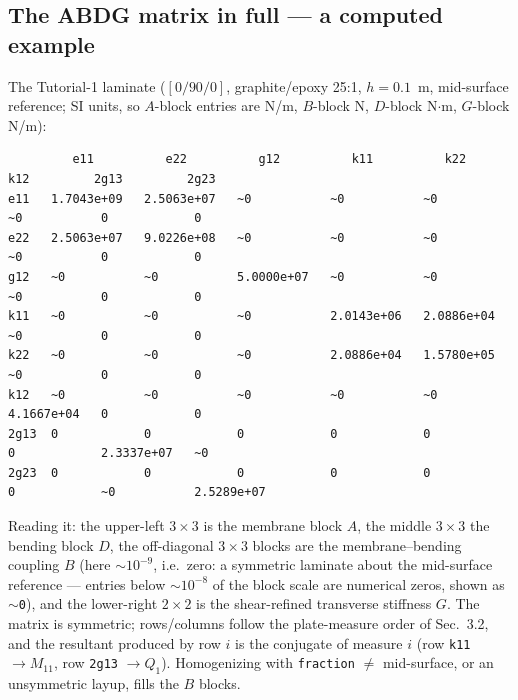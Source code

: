 \documentclass[11pt]{article}
\newcommand{\code}[1]{\texttt{#1}}
\begin{document}
\subsection{The ABDG matrix in full --- a computed example}
The Tutorial-1 laminate ($[0/90/0]$, graphite/epoxy 25:1, $h=0.1$~m,
mid-surface reference; SI units, so $A$-block entries are N/m,
$B$-block N, $D$-block N$\cdot$m, $G$-block N/m):
{\scriptsize
\begin{verbatim}
         e11          e22          g12          k11          k22          k12         2g13         2g23
e11   1.7043e+09   2.5063e+07   ~0           ~0           ~0           ~0           0            0
e22   2.5063e+07   9.0226e+08   ~0           ~0           ~0           ~0           0            0
g12   ~0           ~0           5.0000e+07   ~0           ~0           ~0           0            0
k11   ~0           ~0           ~0           2.0143e+06   2.0886e+04   ~0           0            0
k22   ~0           ~0           ~0           2.0886e+04   1.5780e+05   ~0           0            0
k12   ~0           ~0           ~0           ~0           ~0           4.1667e+04   0            0
2g13  0            0            0            0            0            0            2.3337e+07   ~0
2g23  0            0            0            0            0            0            ~0           2.5289e+07
\end{verbatim}}
Reading it: the upper-left $3\times3$ is the membrane block $A$, the
middle $3\times3$ the bending block $D$, the off-diagonal $3\times3$
blocks are the membrane--bending coupling $B$ (here $\sim10^{-9}$,
i.e.\ zero: a symmetric laminate about the mid-surface reference ---
entries below $\sim10^{-8}$ of the block scale are numerical zeros,
shown as \code{$\sim$0}), and the lower-right $2\times2$ is the
shear-refined transverse stiffness $G$.  The matrix is symmetric;
rows/columns follow the plate-measure order of Sec.~3.2, and the
resultant produced by row $i$ is the conjugate of measure $i$ (row
\code{k11} $\rightarrow M_{11}$, row \code{2g13} $\rightarrow Q_1$).
Homogenizing with \code{fraction} $\ne$ mid-surface, or an
unsymmetric layup, fills the $B$ blocks.
\end{document}
